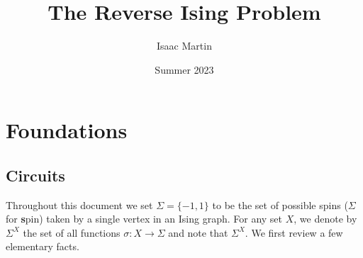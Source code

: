 \documentclass{article}
\begin{document}
\newpage
\title{The Reverse Ising Problem}
\author{Isaac Martin}
\date{Summer 2023}
\maketitle
\tableofcontents
\section{Foundations}

\subsection{Circuits}
Throughout this document we set $\Sigma = \{-1,1\}$ to be the set of possible spins ($\Sigma$ for \textbf{s}pin) taken by a single vertex in an Ising graph. For any set $X$, we denote by $\Sigma^X$ the set of all functions $\sigma: X\to \Sigma$ and note that $\Sigma^X$. We first review a few elementary facts.
\end{document}
